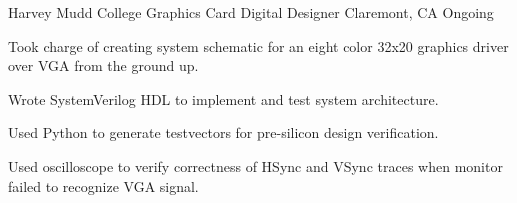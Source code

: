   \begin{cventry}
    {Harvey Mudd College} %
    {Graphics Card Digital Designer} %
    {Claremont, CA} %
    {Ongoing} %
    {
      \begin{cvitems} %
        \item {
        Took charge of creating system schematic for an eight color 32x20 graphics driver over VGA from the ground up.
        }
        \item {
        Wrote SystemVerilog HDL to implement and test system architecture.
        }
        \item {
        Used Python to generate testvectors for pre-silicon design verification.
        }
        \item {
        Used oscilloscope to verify correctness of HSync and VSync traces when monitor failed to recognize VGA signal.
        }
      \end{cvitems}
    }
  \end{cventry}

